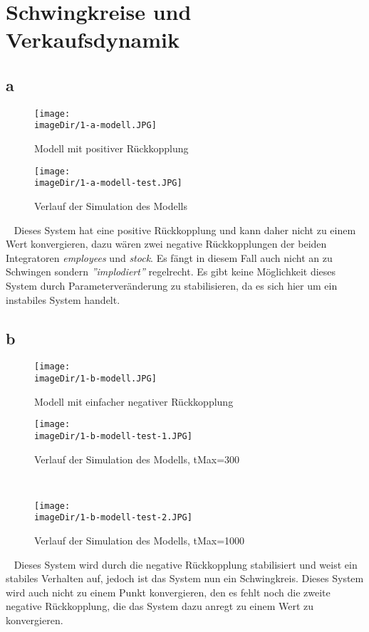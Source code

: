 \section{Schwingkreise und Verkaufsdynamik}

\subsection{a}
\begin{figure}[h]
	\centering
	\texttt{[image: \\imageDir/1-a-modell.JPG]}
	\caption{Modell mit positiver Rückkopplung}
	\label{fig:1-a-modell}
\end{figure}
\begin{figure}[h]
\centering
\texttt{[image: \\imageDir/1-a-modell-test.JPG]}
\caption{Verlauf der Simulation des Modells}
\label{fig:1-a-modell-test}
\end{figure}
\ \newline
Dieses System hat eine positive Rückkopplung und kann daher nicht zu einem Wert konvergieren, dazu wären zwei negative Rückkopplungen der beiden Integratoren \emph{employees} und \emph{stock}. Es fängt in diesem Fall auch nicht an zu Schwingen sondern \emph{''implodiert''} regelrecht. Es gibt keine Möglichkeit dieses System durch Parameterveränderung zu stabilisieren, da es sich hier um ein instabiles System handelt.

\newpage
\subsection{b}
\begin{figure}[h]
	\centering
	\texttt{[image: \\imageDir/1-b-modell.JPG]}
	\caption{Modell mit einfacher negativer Rückkopplung}
	\label{fig:1-b-modell}
\end{figure}
\begin{figure}[h]
	\centering
	\texttt{[image: \\imageDir/1-b-modell-test-1.JPG]}
	\caption{Verlauf der Simulation des Modells, tMax=300}
	\label{fig:1-b-modell-test-1}
\end{figure}
\ \newpage
\begin{figure}[h]
	\centering
	\texttt{[image: \\imageDir/1-b-modell-test-2.JPG]}
	\caption{Verlauf der Simulation des Modells, tMax=1000}
	\label{fig:1-b-modell-test-2}
\end{figure}
\ \newline
Dieses System wird durch die negative Rückkopplung stabilisiert und weist ein stabiles Verhalten auf, jedoch ist das System nun ein Schwingkreis. Dieses System wird auch nicht zu einem Punkt konvergieren, den es fehlt noch die zweite negative Rückkopplung, die das System dazu anregt zu einem Wert zu konvergieren.

